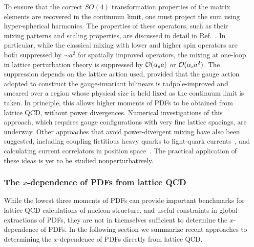 To ensure that the correct $SO(4)$ transformation properties of the matrix 
elements are recovered in the continuum limit, one must project the sum using 
hyper-spherical harmonics.
%
The properties of these operators, such as their mixing patterns and scaling 
properties, are discussed in detail in Ref.~\cite{Davoudi:2012ya}.
%
In particular, while the classical mixing with lower and higher spin operators 
are both suppressed by $\sim a^2$ for spatially improved operators, the mixing 
at one-loop in lattice perturbation theory is suppressed 
by ${\cal O}(\alpha_s a)$ or ${\cal O}(\alpha_s a^2)$. 
%
The suppression depends on the lattice action used, provided that the gauge 
action adopted to construct the gauge-invariant bilinears is tadpole-improved 
and smeared over a region whose physical size is held fixed as the continuum 
limit is taken. 
%
In principle, this allows higher moments of PDFs to be obtained from lattice 
QCD, without power divergences. Numerical investigations of this approach,
which requires gauge configurations with very fine lattice spacings, are 
underway.
%
Other approaches that avoid power-divergent mixing have also been suggested, 
including coupling fictitious heavy quarks to light-quark 
currents~\cite{Detmold:2005gg}, and calculating current correlators in 
position space~\cite{Braun:2007wv}. 
%
The practical application of these ideas is yet to be studied nonperturbatively.

\subsubsection{The $x$-dependence of PDFs from lattice QCD}
\label{sec:xdependence}

While the lowest three moments of PDFs can provide important benchmarks for 
lattice-QCD calculations of nucleon structure, and useful constraints in global 
extractions of PDFs, they are not in themselves sufficient to determine the 
$x$-dependence of PDFs.
%
In the following section we summarize recent approaches to determining the 
$x$-dependence of PDFs directly from lattice QCD.

